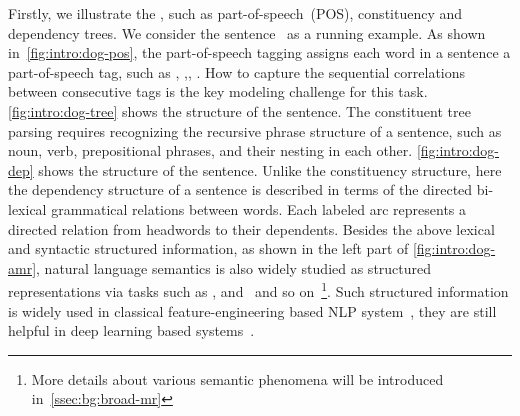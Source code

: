 Firstly, we illustrate the , such as
part-of-speech~(POS), constituency and dependency trees. We consider
the sentence ~as a running example. As shown
in~\autoref{fig:intro:dog-pos}, the part-of-speech tagging assigns
each word in a sentence a part-of-speech tag, such as ,
,, . How to capture the
sequential correlations between consecutive tags is the key modeling
challenge for this task.  \autoref{fig:intro:dog-tree} shows the
 structure of the sentence. The constituent tree
parsing requires recognizing the recursive phrase structure of a
sentence, such as noun, verb, prepositional phrases, and their nesting
in each other. \autoref{fig:intro:dog-dep} shows the  structure of the sentence. Unlike the constituency structure,
here the dependency structure of a sentence is described in terms of
the directed bi-lexical grammatical relations between words. Each
labeled arc represents a directed relation from headwords to their
dependents. Besides the above lexical and syntactic structured
information, as shown in the left part of \autoref{fig:intro:dog-amr},
natural language semantics is also widely studied as structured
representations via tasks such as ,
 and~ and so
on~\footnote{More details about various semantic phenomena will be
  introduced in~\autoref{ssec:bg:broad-mr}}. Such structured
information is widely used in classical feature-engineering based NLP
system~\citep[e.g.,][]{Joh:Nug:08,hovy2010s,punyakanok2008importance},
they are still helpful in deep learning based
systems~\citep{moosavi-strube-2018-using,strubell-etal-2018-linguistically,bowman-etal-2016-fast}.


